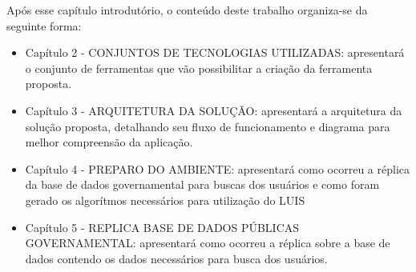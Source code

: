 Após esse capítulo introdutório, o conteúdo deste trabalho organiza-se da seguinte forma:
	\begin{itemize}
		\item{Capítulo 2 - \uppercase{Conjuntos de tecnologias utilizadas}: apresentará o conjunto de ferramentas que vão possibilitar a criação da ferramenta proposta.}
		\item{Capítulo 3 - \uppercase{Arquitetura da solução}: apresentará a arquitetura da solução proposta, detalhando seu fluxo de funcionamento e diagrama para melhor compreensão da aplicação.}
		\item{Capítulo 4 - \uppercase{Preparo do ambiente}: apresentará como ocorreu a réplica da base de dados governamental para buscas dos usuários e como foram gerado os algorítmos necessários para utilização do LUIS}
		\item{Capítulo 5 - \uppercase{Replica base de dados públicas governamental}: apresentará como ocorreu a réplica sobre a base de dados contendo os dados necessários para busca dos usuários.}
	\end{itemize}
